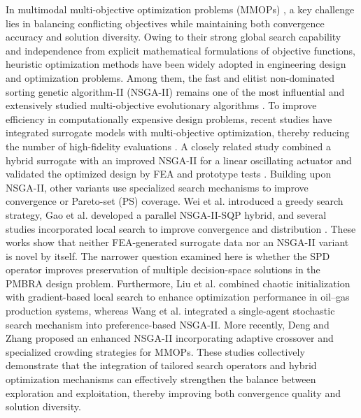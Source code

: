 \par In multimodal multi-objective optimization problems (MMOPs) \cite{deb1999multi,liang2016multimodal}, a key challenge lies in balancing conflicting objectives while maintaining both convergence accuracy and solution diversity. Owing to their strong global search capability and independence from explicit mathematical formulations of objective functions, heuristic optimization methods have been widely adopted in engineering design and optimization problems. Among them, the fast and elitist non-dominated sorting genetic algorithm-II (NSGA-II) remains one of the most influential and extensively studied multi-objective evolutionary algorithms \cite{deb2002fast}.
To improve efficiency in computationally expensive design problems, recent studies have integrated surrogate models with multi-objective optimization, thereby reducing the number of high-fidelity evaluations \cite{rostum2025efficient}. A closely related study combined a hybrid surrogate with an improved NSGA-II for a linear oscillating actuator and validated the optimized design by FEA and prototype tests \cite{yu2026loa}. Building upon NSGA-II, other variants use specialized search mechanisms to improve convergence or Pareto-set (PS) coverage. Wei et al. \cite{wei2008greedy} introduced a greedy search strategy, Gao et al. \cite{gao2008multi} developed a parallel NSGA-II-SQP hybrid, and several studies incorporated local search to improve convergence and distribution \cite{pires2012nsga,zhang2015nsga,mandal2015memetic}. These works show that neither FEA-generated surrogate data nor an NSGA-II variant is novel by itself. The narrower question examined here is whether the SPD operator improves preservation of multiple decision-space solutions in the PMBRA design problem.
Furthermore, Liu et al. \cite{liu2015multi} combined chaotic initialization with gradient-based local search to enhance optimization performance in oil–gas production systems, whereas Wang et al. \cite{wang2017multi} integrated a single-agent stochastic search mechanism into preference-based NSGA-II. More recently, Deng and Zhang \cite{deng2022enhanced} proposed an enhanced NSGA-II incorporating adaptive crossover and specialized crowding strategies for MMOPs. These studies collectively demonstrate that the integration of tailored search operators and hybrid optimization mechanisms can effectively strengthen the balance between exploration and exploitation, thereby improving both convergence quality and solution diversity.


